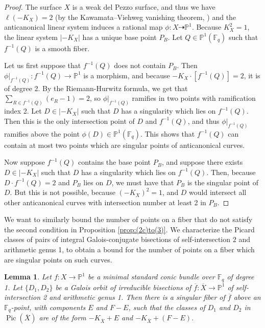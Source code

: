 \documentclass[a4paper, 11pt, reqno]{amsart}
\numberwithin{equation}{section} \numberwithin{figure}{section}
\DeclareMathOperator{\Pic}{Pic}
\def \F {{\mathbb F}}
\def \P {{\mathbb P}}
\newcommand{\ra}{\rightarrow}
\newtheorem{lemma}{Lemma}
\theoremstyle{definition}
\numberwithin{lemma}{section}
\begin{document}
\begin{proof}
    The surface $X$ is a weak del Pezzo surface, and thus we have $\ell(-K_X) =  2$ (by the Kawamata–Viehweg vanishing theorem, \cite{kawamata, viehweg}) and the anticanonical linear system induces a rational map $\phi \colon X \dashrightarrow \P^1$. Because $K_X^2 = 1$, the linear system $|-K_X|$ has a unique base point $P_B$. Let $Q \in \P^1(\F_q)$ such that $f^{-1}(Q)$ is a smooth fiber.
    
    Let us first suppose that $f^{-1}(Q)$ does not contain $P_B$. Then $\phi|_{f^{-1}(Q)} \colon f^{-1}(Q) \ra \P^1$ is a morphism, and because $-K_X \cdot [f^{-1}(Q)] = 2$, it is of degree 2. By the Riemann-Hurwitz formula, we get that $\sum_{R \in f^{-1}(Q)} (e_R - 1) = 2$, so $\phi|_{f^{-1}(Q)}$ ramifies in two points with ramification index 2. Let $D \in |-K_X|$ such that $D$ has a singularity which lies on $f^{-1}(Q)$. Then this is the only intersection point of $D$ and $f^{-1}(Q)$, and thus $\phi|_{f^{-1}(Q)}$ ramifies above the point $\phi(D) \in \P^1(\F_q)$. This shows that $f^{-1}(Q)$ can contain at most two points which are singular points of anticanonical curves. 
    
    Now suppose $f^{-1}(Q)$ contains the base point $P_B$, and suppose there exists $D \in |-K_X|$ such that $D$ has a singularity which lies on $f^{-1}(Q)$. Then, because $D \cdot f^{-1}(Q) = 2$ and $P_B$ lies on $D$, we must have that $P_B$ is the singular point of $D$. But this is not possible, because $(-K_X)^2 = 1$, and $D$ would intersect all other anticanonical curves with intersection number at least 2 in $P_B$. 
\end{proof}

We want to similarly bound the number of points on a fiber that do not satisfy the second condition in Proposition \ref{prop:(2c)to(3)}. We characterize the Picard classes of pairs of integral Galois-conjugate bisections of self-intersection $2$ and arithmetic genus 1, to obtain a bound for the number of points on a fiber which are singular points on such curves.

\begin{lemma}\label{lem:(2c)selfintersection2classes}
    Let $f \colon X \ra \P^1$ be a minimal standard conic bundle over $\F_q$ of degree 1. Let $\{D_1, D_2\}$ be a Galois orbit of irreducible bisections of $\overline{f} \colon \overline{X} \ra \P^1$ of self-intersection 2 and arithmetic genus 1. Then there is a singular fiber of $\overline{f}$ above an $\F_q$-point, with components $E$ and $F-E$, such that the classes of $D_1$ and $D_2$ in $\Pic(\overline{X})$ are of the form $-K_{\overline{X}} + E$ and $-K_{\overline{X}} + (F-E)$.
\end{lemma}
\end{document}
